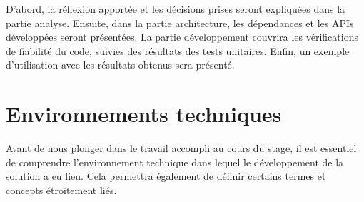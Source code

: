 \documentclass[a4paper, 12pt]{report}
\begin{document}
D'abord, la réflexion apportée et les décisions prises seront expliquées dans la partie analyse. Ensuite, dans la partie architecture, les dépendances et les APIs développées seront présentées. La partie développement couvrira les vérifications de fiabilité du code, suivies des résultats des tests unitaires. Enfin, un exemple d'utilisation avec les résultats obtenus sera présenté.


\chapter{\textbf{Environnements techniques}}
Avant de nous plonger dans le travail accompli au cours du stage, il est essentiel de comprendre l’environnement technique dans lequel le développement de la solution a eu lieu. Cela permettra également de définir certains termes et concepts étroitement liés.
\end{document}
